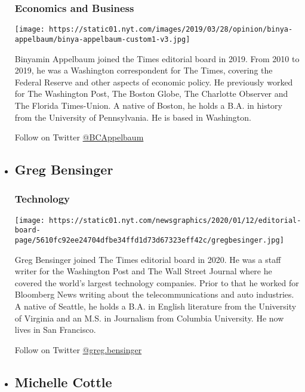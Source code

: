\begin{itemize}
  \hypertarget{economics-and-business}{%
  \subsubsection{Economics and Business}\label{economics-and-business}}

  \texttt{[image: https://static01.nyt.com/images/2019/03/28/opinion/binya-appelbaum/binya-appelbaum-custom1-v3.jpg]}

  Binyamin Appelbaum joined the Times editorial board in 2019. From 2010
  to 2019, he was a Washington correspondent for The Times, covering the
  Federal Reserve and other aspects of economic policy. He previously
  worked for The Washington Post, The Boston Globe, The Charlotte
  Observer and The Florida Times-Union. A native of Boston, he holds a
  B.A. in history from the University of Pennsylvania. He is based in
  Washington.

  Follow on Twitter \href{http://twitter.com/BCAppelbaum}{@BCAppelbaum}
\item
  \hypertarget{greg-bensinger}{%
  \subsection{Greg Bensinger}\label{greg-bensinger}}

  \hypertarget{technology}{%
  \subsubsection{Technology}\label{technology}}

  \texttt{[image: https://static01.nyt.com/newsgraphics/2020/01/12/editorial-board-page/5610fc92ee24704dfbe34ffd1d73d67323eff42c/gregbesinger.jpg]}

  Greg Bensinger joined The Times editorial board in 2020. He was a
  staff writer for the Washington Post and The Wall Street Journal where
  he covered the world's largest technology companies. Prior to that he
  worked for Bloomberg News writing about the telecommunications and
  auto industries. A native of Seattle, he holds a B.A. in English
  literature from the University of Virginia and an M.S. in Journalism
  from Columbia University. He now lives in San Francisco.

  Follow on Twitter
  \href{https://twitter.com/GregBensinger}{@greg.bensinger}
\item
  \hypertarget{michelle-cottle}{%
  \subsection{Michelle Cottle}\label{michelle-cottle}}


\end{itemize}
